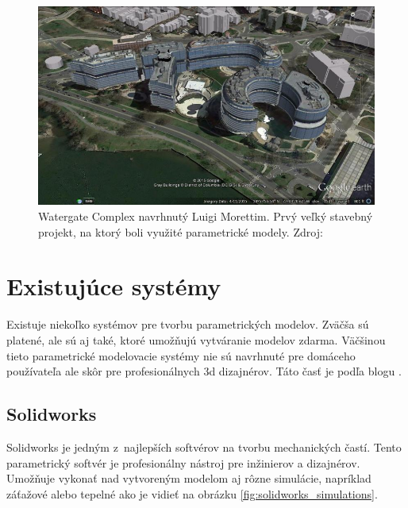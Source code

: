 \begin{figure}[H]
    \centering
    \includegraphics[width = \linewidth]{obrazky-figures/watergate-complex.jpg}
    \caption{Watergate Complex navrhnutý Luigi Morettim. Prvý veľký stavebný projekt, na ktorý boli využité parametrické modely. Zdroj: \cite{munger_2015}}
    \label{fig:Watergate}
\end{figure}





\section{Existujúce systémy}
Existuje niekoľko systémov pre tvorbu parametrických modelov. Zväčša sú platené, ale sú aj také, ktoré umožňujú vytváranie modelov zdarma. Väčšinou tieto parametrické modelovacie systémy nie sú navrhnuté pre domáceho používateľa ale skôr pre profesionálnych 3d dizajnérov. Táto časť je podľa blogu \cite{gaget_2018}.


\subsection*{Solidworks}
Solidworks je jedným z~najlepších softvérov na tvorbu mechanických častí. Tento parametrický softvér je profesionálny nástroj pre inžinierov a dizajnérov. Umožňuje vykonať nad vytvoreným modelom aj rôzne simulácie, napríklad záťažové alebo tepelné ako je vidieť na obrázku \ref{fig:solidworks_simulations}.



